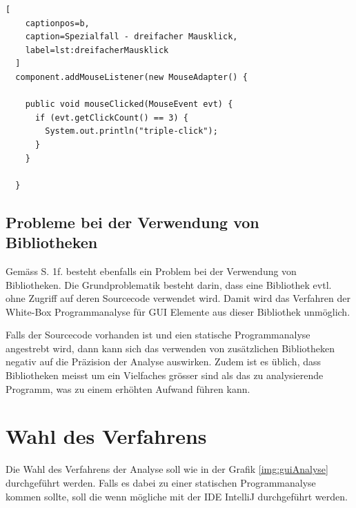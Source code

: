   \begin{lstlisting}[
    captionpos=b,
    caption=Spezialfall - dreifacher Mausklick,
    label=lst:dreifacherMausklick
  ]
  component.addMouseListener(new MouseAdapter() {

    public void mouseClicked(MouseEvent evt) {
      if (evt.getClickCount() == 3) {
        System.out.println("triple-click");
      }
    }

  }
  \end{lstlisting}
  
  \subsection{Probleme bei der Verwendung von Bibliotheken}
  
  Gemäss \cite{GUIAnalysenUndBibliotheken} S. 1f. besteht ebenfalls ein Problem
  bei der Verwendung von Bibliotheken. Die Grundproblematik besteht darin,
  dass eine Bibliothek evtl. ohne Zugriff auf deren Sourcecode verwendet wird.
  Damit wird das Verfahren der White-Box Programmanalyse für GUI Elemente aus
  dieser Bibliothek unmöglich.
  
  Falls der Sourcecode vorhanden ist und eien statische Programmanalyse
  angestrebt wird, dann kann sich das verwenden von zusätzlichen Bibliotheken
  negativ auf die Präzision der Analyse auswirken. Zudem ist es üblich, dass 
  Bibliotheken meisst um ein Vielfaches grösser sind als das zu analysierende
  Programm, was zu einem erhöhten Aufwand führen kann.
  
  \section{Wahl des Verfahrens}
  
  Die Wahl des Verfahrens der Analyse soll wie in der Grafik
  \ref{img:guiAnalyse} durchgeführt werden. Falls es dabei zu einer statischen
  Programmanalyse kommen sollte, soll die wenn mögliche mit der \ac{IDE}
  IntelliJ durchgeführt werden.
  
